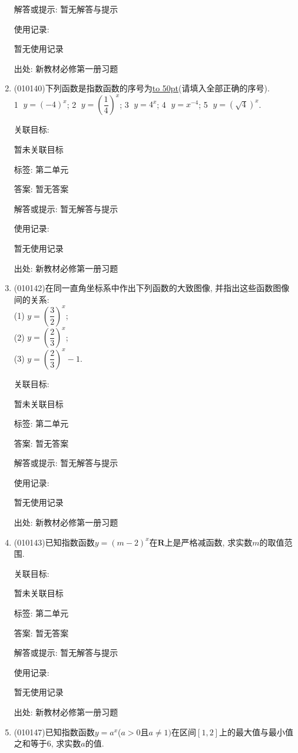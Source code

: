 \documentclass[10pt,a4paper]{article}
\newcommand{\blank}[1]{\underline{\hbox to #1pt{}}}
\begin{document}
\begin{enumerate}[1.]
解答或提示: 暂无解答与提示

使用记录:

暂无使用记录


出处: 新教材必修第一册习题
\item { (010140)}下列函数是指数函数的序号为\blank{50}(请填入全部正确的序号).\\
\textcircled{1} $y=(-4)^x$; \textcircled{2} $y=(\dfrac 14)^x$; \textcircled{3} $y=4^x$; \textcircled{4} $y=x^{-4}$; \textcircled{5} $y=(\sqrt 4)^x$.


关联目标:

暂未关联目标



标签: 第二单元

答案: 暂无答案

解答或提示: 暂无解答与提示

使用记录:

暂无使用记录


出处: 新教材必修第一册习题
\item { (010142)}在同一直角坐标系中作出下列函数的大致图像, 并指出这些函数图像间的关系:\\
(1) $y=(\dfrac 32)^x$;\\
(2) $y=(\dfrac 23)^x$;\\
(3) $y=(\dfrac 23)^x-1$.


关联目标:

暂未关联目标



标签: 第二单元

答案: 暂无答案

解答或提示: 暂无解答与提示

使用记录:

暂无使用记录


出处: 新教材必修第一册习题
\item { (010143)}已知指数函数$y=(m-2)^x$在$\mathbf{R}$上是严格减函数, 求实数$m$的取值范围.


关联目标:

暂未关联目标



标签: 第二单元

答案: 暂无答案

解答或提示: 暂无解答与提示

使用记录:

暂无使用记录


出处: 新教材必修第一册习题
\item { (010147)}已知指数函数$y=a^x$($a>0$且$a\ne 1)$在区间$[1, 2]$上的最大值与最小值之和等于$6$, 求实数$a$的值.



\end{enumerate}
\end{document}
